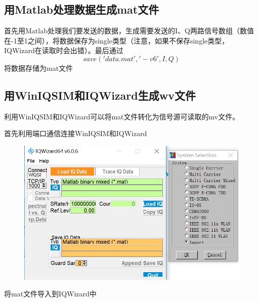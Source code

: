 \documentclass[UTF8]{ctexart}
\begin{document}
\subsection{用Matlab处理数据生成mat文件}

首先用Matlab处理我们要发送的数据，生成需要发送的I、Q两路信号数组（数值在-1至1之间），将数据保存为single类型（注意，如果不保存single类型，IQWizard在读取时会出错）。最后通过$$save('data.mat','-v6',I,Q)$$将数据存储为mat文件

\subsection{用WinIQSIM和IQWizard生成wv文件}

利用WinIQSIM和IQWizard可以将mat文件转化为信号源可读取的mv文件。

首先利用端口通信连接WinIQSIM和IQWizard

\begin{figure}[H]
        \centering
        \includegraphics[width=\textwidth]{images//connect.png}
\end{figure}

将mat文件导入到IQWizard中
\end{document}
